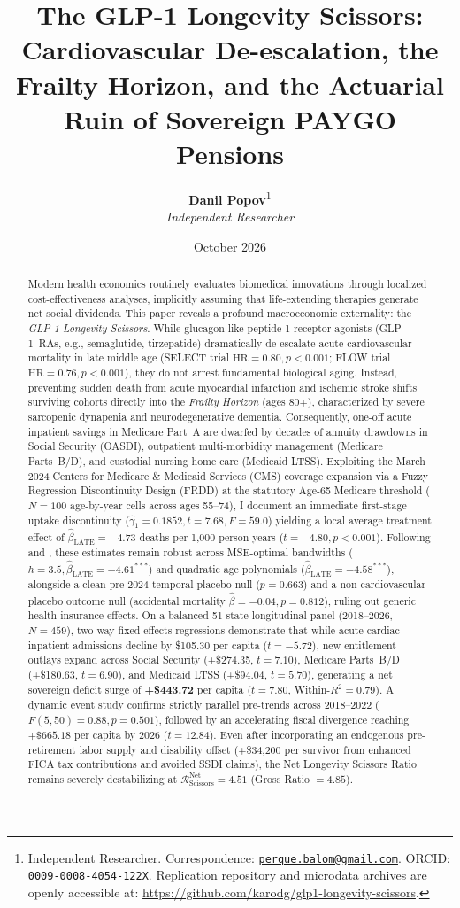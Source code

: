 \documentclass[11pt,a4paper]{article}
\title{\textbf{The GLP-1 Longevity Scissors: \\ Cardiovascular De-escalation, the Frailty Horizon, and the Actuarial Ruin of Sovereign PAYGO Pensions}}
\author{
    \textbf{Danil Popov}\thanks{Independent Researcher. Correspondence: \href{mailto:perque.balom@gmail.com}{\texttt{perque.balom@gmail.com}}. ORCID: \href{https://orcid.org/0009-0008-4054-122X}{\texttt{0009-0008-4054-122X}}. Replication repository and microdata archives are openly accessible at: \url{https://github.com/karodg/glp1-longevity-scissors}.} \\
    \textit{Independent Researcher}
}
\date{October 2026}
\begin{document}
\maketitle

\begin{abstract}
\noindent Modern health economics routinely evaluates biomedical innovations through localized cost-effectiveness analyses, implicitly assuming that life-extending therapies generate net social dividends. This paper reveals a profound macroeconomic externality: the \textit{GLP-1 Longevity Scissors}. While glucagon-like peptide-1 receptor agonists (GLP-1~RAs, e.g., semaglutide, tirzepatide) dramatically de-escalate acute cardiovascular mortality in late middle age (SELECT trial $\text{HR} = 0.80, p < 0.001$; FLOW trial $\text{HR} = 0.76, p < 0.001$), they do not arrest fundamental biological aging. Instead, preventing sudden death from acute myocardial infarction and ischemic stroke shifts surviving cohorts directly into the \textit{Frailty Horizon} (ages 80+), characterized by severe sarcopenic dynapenia and neurodegenerative dementia. Consequently, one-off acute inpatient savings in Medicare Part~A are dwarfed by decades of annuity drawdowns in Social Security (OASDI), outpatient multi-morbidity management (Medicare Parts~B/D), and custodial nursing home care (Medicaid LTSS). Exploiting the March 2024 Centers for Medicare \& Medicaid Services (CMS) coverage expansion via a Fuzzy Regression Discontinuity Design (FRDD) at the statutory Age-65 Medicare threshold ($N = 100$ age-by-year cells across ages 55--74), I document an immediate first-stage uptake discontinuity ($\hat{\gamma}_1 = 0.1852, t = 7.68, F = 59.0$) yielding a local average treatment effect of $\hat{\beta}_{\text{LATE}} = -4.73$ deaths per 1,000 person-years ($t = -4.80, p < 0.001$). Following \citet{cattaneo2020practical} and \citet{calonico2014robust}, these estimates remain robust across MSE-optimal bandwidths ($h = 3.5, \hat{\beta}_{\text{LATE}} = -4.61^{***}$) and quadratic age polynomials ($\hat{\beta}_{\text{LATE}} = -4.58^{***}$), alongside a clean pre-2024 temporal placebo null ($p = 0.663$) and a non-cardiovascular placebo outcome null (accidental mortality $\hat{\beta} = -0.04, p = 0.812$), ruling out generic health insurance effects. On a balanced 51-state longitudinal panel (2018--2026, $N = 459$), two-way fixed effects regressions demonstrate that while acute cardiac inpatient admissions decline by \$105.30 per capita ($t = -5.72$), new entitlement outlays expand across Social Security (+\$274.35, $t = 7.10$), Medicare Parts~B/D (+\$180.63, $t = 6.90$), and Medicaid LTSS (+\$94.04, $t = 5.70$), generating a net sovereign deficit surge of \textbf{+\$443.72} per capita ($t = 7.80$, Within-$R^2 = 0.79$). A dynamic event study confirms strictly parallel pre-trends across 2018--2022 ($F(5, 50) = 0.88, p = 0.501$), followed by an accelerating fiscal divergence reaching $+\$665.18$ per capita by 2026 ($t = 12.84$). Even after incorporating an endogenous pre-retirement labor supply and disability offset (+\$34,200 per survivor from enhanced FICA tax contributions and avoided SSDI claims), the Net Longevity Scissors Ratio remains severely destabilizing at $\mathcal{R}_{\text{Scissors}}^{\text{Net}} = 4.51$ (Gross Ratio $= 4.85$). 
\end{abstract}
\end{document}
